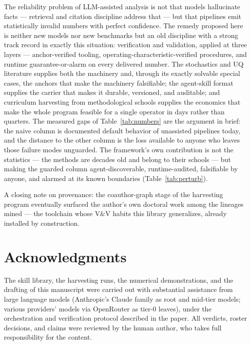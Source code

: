 \documentclass[11pt,a4paper]{article}
\begin{document}
The reliability problem of LLM-assisted analysis is not that models
hallucinate facts --- retrieval and citation discipline address that ---
but that pipelines emit statistically invalid numbers with perfect
confidence. The remedy proposed here is neither new models nor new
benchmarks but an old discipline with a strong track record in exactly this
situation: verification and validation, applied at three layers ---
anchor-verified tooling, operating-characteristic-verified procedures, and
runtime guarantee-or-alarm on every delivered number. The stochastics and UQ literature supplies both the
machinery and, through its exactly solvable special cases, the anchors that
make the machinery falsifiable; the agent-skill format supplies the carrier
that makes it durable, versioned, and auditable; and curriculum harvesting
from methodological schools supplies the economics that make the whole
program feasible for a single operator in days rather than quarters. The
measured gaps of Table~\ref{tab:numbers} are the argument in brief: the
naive column is documented default behavior of unassisted pipelines today,
and the distance to the other column is the loss available to anyone who
leaves those failure modes unguarded. The framework's own contribution is
not the statistics --- the methods are decades old and belong to their
schools --- but making the guarded column agent-discoverable,
runtime-audited, falsifiable by anyone, and alarmed at its known
boundaries (Table~\ref{tab:perturb}).

\medskip
\noindent A closing note on provenance: the coauthor-graph stage of the
harvesting program eventually surfaced the author's own doctoral work
\citep{moraes2014} among the lineages mined --- the toolchain whose V\&V
habits this library generalizes, already installed by construction.

\section*{Acknowledgments}

The skill library, the harvesting runs, the numerical demonstrations, and
the drafting of this manuscript were carried out with substantial
assistance from large language models (Anthropic's Claude family as root
and mid-tier models; various providers' models via OpenRouter as tier-0
leaves), under the orchestration and verification protocol described in
the paper. All verdicts, roster decisions, and claims were reviewed by the
human author, who takes full responsibility for the content.



\end{document}

